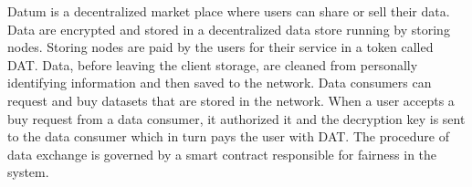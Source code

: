 Datum is a decentralized market place where users can share or sell their data. Data are encrypted and stored in a decentralized data store running by storing nodes. Storing nodes are paid by the users for their service in a token called DAT. Data, before leaving the client storage, are cleaned from personally identifying information and then saved to the network. Data consumers can request and buy datasets that are stored in the network. When a user accepts a buy request from a data consumer, it authorized it and the decryption key is sent to the data consumer which in turn pays the user with DAT. The procedure of data exchange is governed by a smart contract responsible for fairness in the system.
